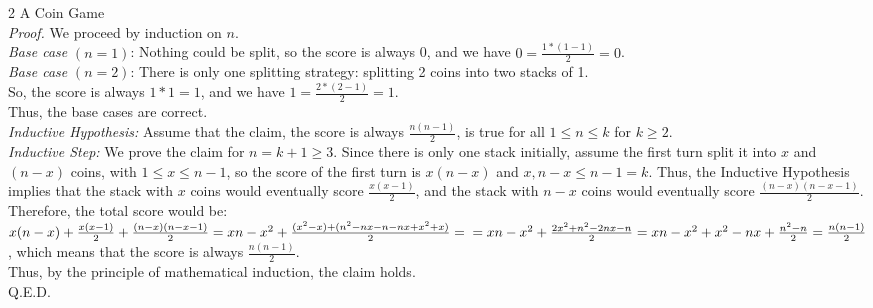 \documentclass{article}
\begin{document}
{\Large 2 A Coin Game} \\[.5cm]
\textit{Proof.} We proceed by induction on $n.$ \\[.3cm]
\textit{Base case} $(n = 1)$: Nothing could be split, so the score is always 0, and we have $0 = \frac{1*(1-1)}{2} = 0$.\\
\textit{Base case} $(n = 2)$: There is only one splitting strategy: splitting 2 coins into two stacks of 1.\\
\indent\indent\indent\indent\indent\indent So, the score is always $1 * 1 = 1$, and we have $1 = \frac{2*(2-1)}{2} = 1$.\\
Thus, the base cases are correct.\\[.3cm]
\textit{Inductive Hypothesis:} Assume that the claim, the score is always $\frac{n(n-1)}{2}$, is true for all $1\leq n\leq k$ for $k\geq 2.$\\[.3cm]
\textit{Inductive Step:} We prove the claim for $n = k + 1\geq 3.$ Since there is only one stack initially, assume the first turn split it into $x$ and $(n - x)$ coins, with $1\leq x\leq n - 1$, so the score of the first turn is $x(n - x)$ and $x, n - x\leq n - 1 = k$. Thus, the Inductive Hypothesis implies that the stack with $x$ coins would eventually score $\frac{x(x-1)}{2}$, and the stack with $n - x$ coins would eventually score $\frac{(n-x)(n-x-1)}{2}.$ Therefore, the total score would be: $x(n - x) + \frac{x(x-1)}{2} + \frac{(n-x)(n-x-1)}{2} = xn - x^2 + \frac{(x^2 - x) + (n^2 - nx - n - nx + x^2 + x)}{2} =\\=xn - x^2 + \frac{2x^2 + n^2 - 2nx - n}{2} = xn - x^2 + x^2 - nx + \frac{n^2 - n}{2} = \frac{n(n-1)}{2}$, which means that the score is always $\frac{n(n - 1)}{2}.$\\[.3cm]
Thus, by the principle of mathematical induction, the claim holds.\\[.3cm]
Q.E.D.
\end{document}
